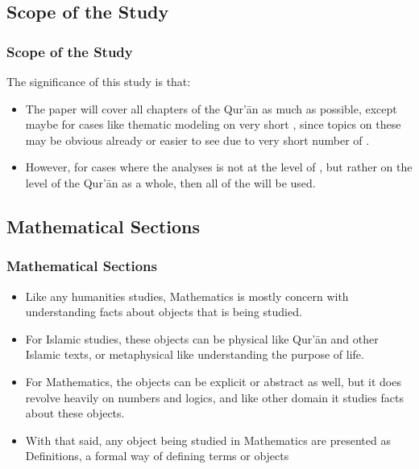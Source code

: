 \documentclass{beamer}
\theoremstyle{definition}
\begin{document}
\subsection{Scope of the Study}
\begin{frame}[t, fragile]\justifying
\frametitle{Scope of the Study}
The significance of this study is that:
\begin{itemize}
    \item The paper will cover all chapters of the Qur'\=an as much as possible, except maybe for cases like thematic modeling on very short  , since topics on these   may be obvious already or easier to see due to very short number of  . 
    \item However, for cases where the analyses is not at the level of  , but rather on the level of the Qur'\=an as a whole, then all of the   will be used. 
\end{itemize}
\end{frame}

\subsection{Mathematical Sections}
\begin{frame}[t, fragile]\justifying
\frametitle{Mathematical Sections}
\begin{itemize}
    \item Like any humanities studies, Mathematics is mostly concern with understanding facts about objects that is being studied. 
    \item For Islamic studies, these objects can be physical like Qur'\=an and other Islamic texts, or metaphysical like understanding the purpose of life. \item For Mathematics, the objects can be explicit or abstract as well, but it does revolve heavily on numbers and logics, and like other domain it studies facts about these objects. 
    \item With that said, any object being studied in Mathematics are presented as Definitions, a formal way of defining terms or objects
\end{itemize}
\end{frame}
\end{document}
